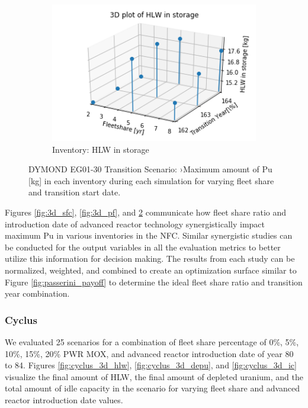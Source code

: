 \begin{figure}[H]
\begin{subfigure}[t]{0.4\textwidth}
    \end{subfigure}
    \begin{subfigure}[t]{0.4\textwidth}
        \centering
        \includegraphics[width=\linewidth]{figures/3d_hlw} 
        \caption{Inventory: HLW in storage}
        \label{fig:3d_hlw}
    \end{subfigure}
    \caption{DYMOND EG01-30 Transition Scenario: ›Maximum amount of Pu [kg] in each inventory during each simulation for varying fleet share and transition start date.}
\end{figure}

Figures \ref{fig:3d_sfc}, \ref{fig:3d_pf}, and \ref{fig:3d_hlw}
communicate how fleet share ratio and introduction date of advanced 
reactor technology 
synergistically impact maximum Pu in various inventories in the 
\gls{NFC}. 
Similar synergistic studies can be conducted for the output variables in 
all the evaluation metrics to better utilize this information for decision making. 
The results from each study can be normalized, weighted, and 
combined to create an optimization surface similar 
to Figure \ref{fig:passerini_payoff} to determine the ideal fleet share 
ratio and transition year combination. 

\subsubsection{\textbf{Cyclus}}
We evaluated 25 scenarios for a combination of fleet share percentage 
of 0\%, 5\%, 10\%, 15\%, 20\% PWR MOX, and advanced reactor introduction 
date of year 80 to 84.
Figures \ref{fig:cyclus_3d_hlw}, \ref{fig:cyclus_3d_depu}, and 
\ref{fig:cyclus_3d_ic}
visualize the final amount of HLW, the final amount of depleted uranium, 
and the total amount of idle capacity in the scenario for varying 
fleet share and advanced reactor introduction date values. 

